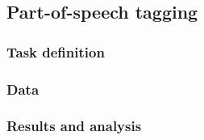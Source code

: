 
\subsection{Part-of-speech tagging}


\subsubsection{Task definition}


\subsubsection{Data}


\subsubsection{Results and analysis}


\pagebreak
